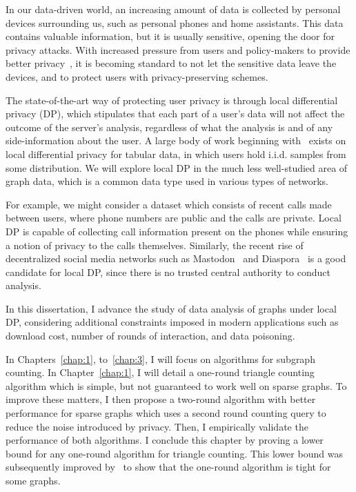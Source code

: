 \documentclass[12pt]{ucsddissertation}
\begin{document}
\begin{dissertationintroduction}
In our data-driven world, an increasing amount of data is collected by personal devices 
surrounding us, such as personal phones and home assistants. This data contains valuable
information, but it is usually sensitive, opening the door for privacy attacks. With
increased pressure from users and policy-makers to provide better privacy~\cite{voigt2017eu}, 
it is becoming standard to not let the sensitive data leave the devices, and to protect users
with privacy-preserving schemes.

The state-of-the-art way of protecting user privacy is through local differential privacy (DP),
which stipulates that each part of a user's data will not affect the outcome of the 
server's analysis, regardless of what the analysis is and of any side-information about
the user. A large body of work beginning with~\cite{Kasiviswanathan_FOCS08} exists on local 
differential privacy for tabular data, in which users hold i.i.d. samples from some distribution.
We will explore local DP in the much less well-studied area of graph data, which 
is a common data type used in various types of networks.

For example, we might consider a dataset which consists of recent calls made between users, where 
phone numbers are public and the calls are private. Local DP is capable of collecting call
information present on the phones while ensuring a notion of privacy to the calls themselves.
Similarly, the recent rise of decentralized social media networks such as Mastodon~\cite{Mastodon} 
and Diaspora~\cite{Diaspora} is a good candidate for local DP, since there is no trusted 
central authority to conduct analysis.

In this dissertation, I advance the study of data analysis of graphs under local DP, 
considering additional constraints imposed in modern applications such as download cost, 
number of rounds of interaction, and data poisoning.

In Chapters~\ref{chap:1}, to~\ref{chap:3}, I will focus on algorithms for subgraph counting.
In Chapter~\ref{chap:1},
I will detail a one-round triangle counting algorithm which is simple, but not guaranteed to work 
well on sparse graphs. To improve these matters,
I then propose a two-round algorithm with better performance 
for sparse graphs which uses a second round counting query to reduce the noise introduced by privacy.
Then, I empirically validate the performance of both algorithms.
I conclude this chapter by proving a lower bound for any one-round algorithm for triangle
counting. This lower bound was subsequently improved by~\cite{eden2023triangle} to 
show that the one-round algorithm is tight for some graphs.


\end{dissertationintroduction}
\end{document}
